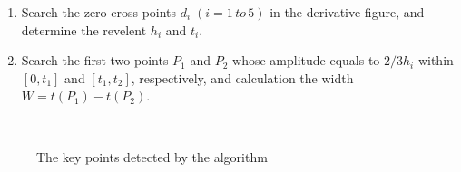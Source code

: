 \begin{enumerate}[(1)]
\begin{equation}
\begin{array}{ll}
                \frac{(x'_i-x'_{i-1})+(x'_{i+1}-x'_{i-1})/2}{2}, &
                i=2,\ldots,N-1\\
                x''_2, & i=1\\
                x''_N, & i=N-1\\
            \end{array} \right.
            \label{equ:2nddiff}
        \end{equation}
        This eclectic derivative estimation method has advantages over
        the traditional method, which considers only two points, in
        robustness and generality. The method considers three points
        at meantime and is more accurate. Because this difference
        method makes no sense on the first point and the last point,
        let the derivative of second point and the one of penultimate
        point approximate to them, respectively.  
    \item Search the zero-cross points $d_i\;(i=1\,to\,5)$ in
        the derivative figure, and determine the revelent $h_i$ and
        $t_i$. 
    \item Search the first two points $P_1$ and $P_2$ whose amplitude equals to
        $2/3h_i$ within $[0,t_1]$ and $[t_1, t_2]$, respectively, and
        calculation the width $W=t(P_1)-t(P_2)$.
\end{enumerate}
\begin{figure}
    \centering
    \\
    \caption{The key points detected by the algorithm}
    \label{fig:keypointsgroup}
\end{figure}


